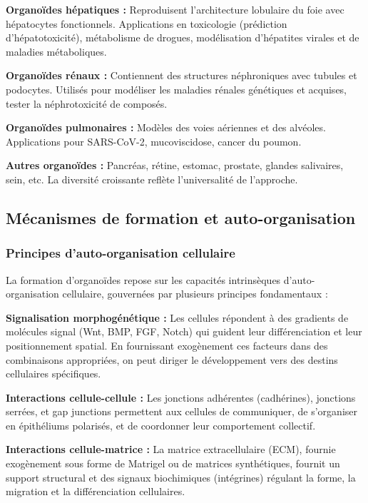 \textbf{Organoïdes hépatiques :}
Reproduisent l'architecture lobulaire du foie avec hépatocytes fonctionnels. Applications en toxicologie (prédiction d'hépatotoxicité), métabolisme de drogues, modélisation d'hépatites virales et de maladies métaboliques.

\textbf{Organoïdes rénaux :}
Contiennent des structures néphroniques avec tubules et podocytes. Utilisés pour modéliser les maladies rénales génétiques et acquises, tester la néphrotoxicité de composés.

\textbf{Organoïdes pulmonaires :}
Modèles des voies aériennes et des alvéoles. Applications pour SARS-CoV-2, mucoviscidose, cancer du poumon.

\textbf{Autres organoïdes :}
Pancréas, rétine, estomac, prostate, glandes salivaires, sein, etc. La diversité croissante reflète l'universalité de l'approche.

\subsection{Mécanismes de formation et auto-organisation}

\subsubsection{Principes d'auto-organisation cellulaire}

La formation d'organoïdes repose sur les capacités intrinsèques d'auto-organisation cellulaire, gouvernées par plusieurs principes fondamentaux :

\textbf{Signalisation morphogénétique :}
Les cellules répondent à des gradients de molécules signal (Wnt, BMP, FGF, Notch) qui guident leur différenciation et leur positionnement spatial. En fournissant exogènement ces facteurs dans des combinaisons appropriées, on peut diriger le développement vers des destins cellulaires spécifiques.

\textbf{Interactions cellule-cellule :}
Les jonctions adhérentes (cadhérines), jonctions serrées, et gap junctions permettent aux cellules de communiquer, de s'organiser en épithéliums polarisés, et de coordonner leur comportement collectif.

\textbf{Interactions cellule-matrice :}
La matrice extracellulaire (ECM), fournie exogènement sous forme de Matrigel ou de matrices synthétiques, fournit un support structural et des signaux biochimiques (intégrines) régulant la forme, la migration et la différenciation cellulaires.

